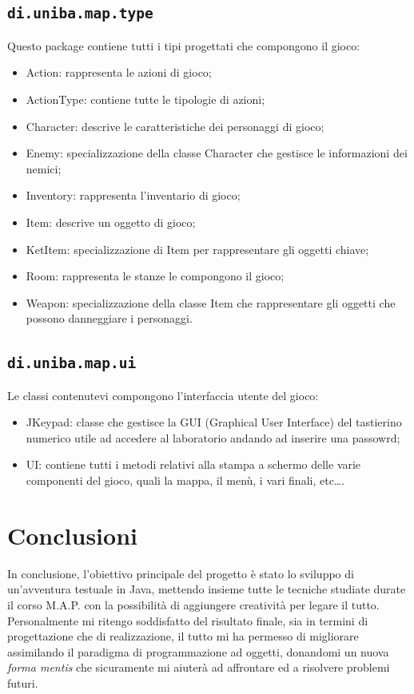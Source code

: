 \documentclass[italian,12pt,a4paper]{article}
\begin{document}
	\subsection{\texttt{di.uniba.map.type}}
	Questo package contiene tutti i tipi progettati che compongono il gioco:
	\begin{itemize}
		\item Action: rappresenta le azioni di gioco;
		\item ActionType: contiene tutte le tipologie di azioni;
		\item Character: descrive le caratteristiche dei personaggi di gioco;
		\item Enemy: specializzazione della classe Character che gestisce le informazioni dei nemici;
		\item Inventory: rappresenta l'inventario di gioco; 
		\item Item: descrive un oggetto di gioco;
		\item KetItem: specializzazione di Item per rappresentare gli oggetti chiave;
		\item Room: rappresenta le stanze le compongono il gioco;
		\item Weapon: specializzazione della classe Item che rappresentare gli oggetti che possono danneggiare i personaggi.
	\end{itemize}
	
	\subsection{\texttt{di.uniba.map.ui}}
	Le classi contenutevi compongono l'interfaccia utente del gioco: 
	\begin{itemize}
		\item JKeypad: classe che gestisce la GUI (Graphical User Interface) del tastierino numerico utile ad accedere al laboratorio andando ad inserire una passowrd;
		\item UI: contiene tutti i metodi relativi alla stampa a schermo delle varie componenti del gioco, quali la mappa, il menù, i vari finali, etc\dots.
	\end{itemize}
	\section{Conclusioni}
	
	In conclusione, l'obiettivo principale del progetto è stato lo sviluppo di un'avventura testuale in Java, mettendo insieme tutte le tecniche studiate durate il corso M.A.P. con la possibilità di aggiungere creatività per legare il tutto.\\
	\linebreak
	Personalmente mi ritengo soddisfatto del risultato finale, sia in termini di progettazione che di realizzazione, il tutto mi ha permesso di migliorare assimilando il paradigma di programmazione ad oggetti, donandomi un nuova \textit{forma mentis} che sicuramente mi aiuterà ad affrontare ed a risolvere problemi futuri. 
\end{document}

